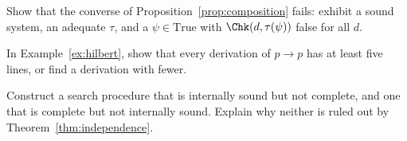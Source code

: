 \begin{exercise}
Show that the converse of Proposition~\ref{prop:composition} fails: exhibit a sound system, an adequate $\tau$, and a $\psi\in\mathrm{True}$ with $\Chk(d,\tau(\psi))$ false for all $d$.
\end{exercise}

\begin{exercise}
In Example~\ref{ex:hilbert}, show that every derivation of $p\to p$ has at least five lines, or find a derivation with fewer.
\end{exercise}

\begin{exercise}
Construct a search procedure that is internally sound but not complete, and one that is complete but not internally sound. Explain why neither is ruled out by Theorem~\ref{thm:independence}.
\end{exercise}
